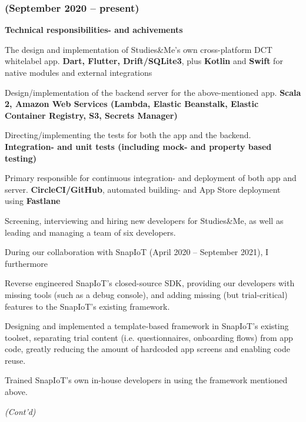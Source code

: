 \documentclass[10pt, a4paper]{article}
\newcommand{\sme}{Studies\&Me}
\begin{document}
\subsubsection*{{\normalfont(September 2020 -- present)}}
\textbf{Technical responsibilities- and achivements}
\begin{outline}
  \1 The design and implementation of \sme's own cross-platform DCT whitelabel app.\newline
    {\footnotesize \textbf{Dart, Flutter, Drift/SQLite3}, plus \textbf{Kotlin} and \textbf{Swift} for native modules and external integrations}

  \1 Design/implementation of the backend server for the above-mentioned app.\newline
  {\footnotesize \textbf{Scala 2, Amazon Web Services (Lambda, Elastic Beanstalk, Elastic Container Registry, S3, Secrets Manager)}}

  \1 Directing/implementing the tests for both the app and the backend.\newline
    {\footnotesize \textbf{Integration- and unit tests (including mock- and property based testing)}}

  \1 Primary responsible for continuous integration- and deployment of both app and server.\newline
    {\footnotesize \textbf{CircleCI/GitHub}, automated building- and App Store deployment using \textbf{Fastlane}}

  \1 Screening, interviewing and hiring new developers for \sme, as well as leading and managing a team of six developers.
\end{outline}

During our collaboration with SnapIoT (April 2020 -- September 2021), I furthermore
\begin{outline}
  \1 Reverse engineered SnapIoT's closed-source SDK, providing our developers with missing tools (such as a debug console), and adding missing (but trial-critical) features to the SnapIoT's existing framework.

  \1 Designing and implemented a template-based framework in SnapIoT's existing toolset, separating trial content (i.e. questionnaires, onboarding flows) from app code, greatly reducing the amount of hardcoded app screens and enabling code reuse.
  
  \1 Trained SnapIoT's own in-house developers in using the framework mentioned above.
\end{outline}
\vspace*{\fill}
\textit{(Cont'd)}
\end{document}
